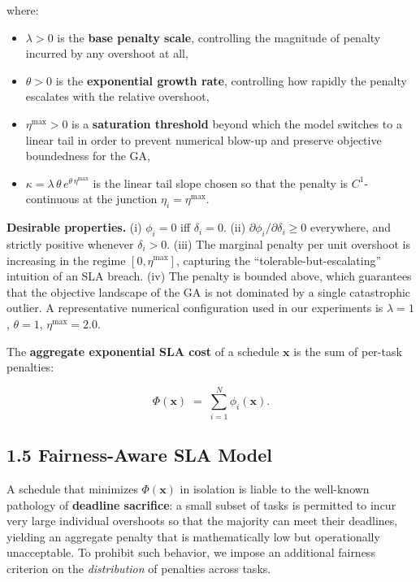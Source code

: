 \documentclass[11pt,a4paper]{article}
\begin{document}
where:

\begin{itemize}[leftmargin=2em,itemsep=2pt]
  \item $\lambda > 0$ is the \textbf{base penalty scale}, controlling the magnitude of penalty incurred by any overshoot at all,
  \item $\theta > 0$ is the \textbf{exponential growth rate}, controlling how rapidly the penalty escalates with the relative overshoot,
  \item $\eta^{\max} > 0$ is a \textbf{saturation threshold} beyond which the model switches to a linear tail in order to prevent numerical blow-up and preserve objective boundedness for the GA,
  \item $\kappa = \lambda \, \theta \, e^{\theta \, \eta^{\max}}$ is the linear tail slope chosen so that the penalty is $C^1$-continuous at the junction $\eta_i = \eta^{\max}$.
\end{itemize}

\textbf{Desirable properties.} (i) $\phi_i = 0$ iff $\delta_i = 0$. (ii) $\partial \phi_i / \partial \delta_i \geq 0$ everywhere, and strictly positive whenever $\delta_i > 0$. (iii) The marginal penalty per unit overshoot is increasing in the regime $[0, \eta^{\max}]$, capturing the ``tolerable-but-escalating'' intuition of an SLA breach. (iv) The penalty is bounded above, which guarantees that the objective landscape of the GA is not dominated by a single catastrophic outlier. A representative numerical configuration used in our experiments is $\lambda = 1$, $\theta = 1$, $\eta^{\max} = 2.0$.

The \textbf{aggregate exponential SLA cost} of a schedule $\mathbf{x}$ is the sum of per-task penalties:

$$
\Phi(\mathbf{x}) \;=\; \sum_{i=1}^{N} \phi_i(\mathbf{x}).
$$

\subsection*{1.5 Fairness-Aware SLA Model}

A schedule that minimizes $\Phi(\mathbf{x})$ in isolation is liable to the well-known pathology of \textbf{deadline sacrifice}: a small subset of tasks is permitted to incur very large individual overshoots so that the majority can meet their deadlines, yielding an aggregate penalty that is mathematically low but operationally unacceptable. To prohibit such behavior, we impose an additional fairness criterion on the \emph{distribution} of penalties across tasks.
\end{document}
